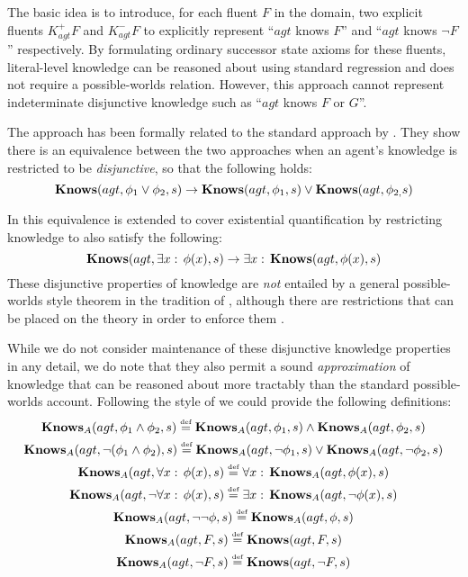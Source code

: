The basic idea is to introduce, for each fluent $F$ in the domain,
two explicit fluents $K_{agt}^{+}F$ and $K_{agt}^{-}F$ to explicitly
represent {}``$agt$ knows $F$'' and {}``$agt$ knows $\neg F$''
respectively. By formulating ordinary successor state axioms for these
fluents, literal-level knowledge can be reasoned about using standard
regression and does not require a possible-worlds relation. However,
this approach cannot represent indeterminate disjunctive knowledge
such as {}``$agt$ knows $F$ or $G$''.

The \citeauthor{demolombe00tractable_sc_belief} approach has been
formally related to the standard \citeauthor{scherl03sc_knowledge}
approach by \citet{petrick02knowledge_equivalence}. They show there
is an equivalence between the two approaches when an agent's knowledge
is restricted to be \emph{disjunctive}, so that the following holds:\[
\mathbf{Knows}(agt,\phi_{1}\vee\phi_{2},s)\rightarrow\mathbf{Knows}(agt,\phi_{1},s)\vee\mathbf{Knows}(agt,\phi_{2,}s)\]


In \citep{Petrick06thesis} this equivalence is extended to cover
existential quantification by restricting knowledge to also satisfy
the following:\[
\mathbf{Knows}(agt,\exists x:\,\phi(x),s)\rightarrow\exists x:\,\mathbf{Knows}(agt,\phi(x),s)\]
 These disjunctive properties of knowledge are \emph{not} entailed
by a general possible-worlds style theorem in the tradition of \citep{scherl03sc_knowledge},
although there are restrictions that can be placed on the theory in
order to enforce them \citep{petrick08cartesian_situations,Petrick06thesis}.

While we do not consider maintenance of these disjunctive knowledge
properties in any detail, we do note that they also permit a sound
\emph{approximation} of knowledge that can be reasoned about more
tractably than the standard possible-worlds account. Following the
style of \citep{petrick02knowledge_equivalence} we could provide
the following definitions:\begin{gather*}
\mathbf{Knows}_{A}(agt,\phi_{1}\wedge\phi_{2},s)\stackrel{\mbox{\tiny def}}{=}\mathbf{Knows}_{A}(agt,\phi_{1},s)\wedge\mathbf{Knows}_{A}(agt,\phi_{2},s)\\
\mathbf{Knows}_{A}(agt,\neg(\phi_{1}\wedge\phi_{2}),s)\stackrel{\mbox{\tiny def}}{=}\mathbf{Knows}_{A}(agt,\neg\phi_{1},s)\vee\mathbf{Knows}_{A}(agt,\neg\phi_{2},s)\\
\mathbf{Knows}_{A}(agt,\forall x:\,\phi(x),s)\stackrel{\mbox{\tiny def}}{=}\forall x:\,\mathbf{Knows}_{A}(agt,\phi(x),s)\\
\mathbf{Knows}_{A}(agt,\neg\forall x:\,\phi(x),s)\stackrel{\mbox{\tiny def}}{=}\exists x:\,\mathbf{Knows}_{A}(agt,\neg\phi(x),s)\\
\mathbf{Knows}_{A}(agt,\neg\neg\phi,s)\stackrel{\mbox{\tiny def}}{=}\mathbf{Knows}_{A}(agt,\phi,s)\\
\mathbf{Knows}_{A}(agt,F,s)\stackrel{\mbox{\tiny def}}{=}\mathbf{Knows}(agt,F,s)\\
\mathbf{Knows}_{A}(agt,\neg F,s)\stackrel{\mbox{\tiny def}}{=}\mathbf{Knows}(agt,\neg F,s)\end{gather*}


